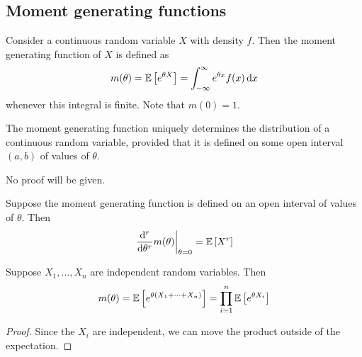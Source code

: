\subsection{Moment generating functions}
Consider a continuous random variable \(X\) with density \(f\).
Then the moment generating function of \(X\) is defined as
\[
	m(\theta) = \mathbb{E}\left[{e^{\theta X}}\right] = \int_{-\infty}^\infty e^{\theta x} f(x) \dd{x}
\]
whenever this integral is finite.
Note that \(m(0) = 1\).
\begin{theorem}
	The moment generating function uniquely determines the distribution of a continuous random variable, provided that it is defined on some open interval \((a, b)\) of values of \(\theta\).
\end{theorem}
No proof will be given.
\begin{theorem}
	Suppose the moment generating function is defined on an open interval of values of \(\theta\).
	Then
	\[
		\eval{\dv[r]{\theta}m(\theta)}_{\theta = 0} = \expect{X^r}
	\]
\end{theorem}
\begin{theorem}
	Suppose \(X_1, \dots, X_n\) are independent random variables.
	Then
	\[
		m(\theta) = \mathbb{E}\left[{e^{\theta(X_1 + \dots + X_n)}}\right] = \prod_{i=1}^n \mathbb{E}\left[{e^{\theta X_i}}\right]
	\]
\end{theorem}
\begin{proof}
	Since the \(X_i\) are independent, we can move the product outside of the expectation.
\end{proof}

